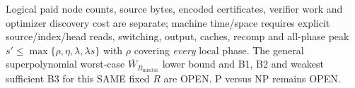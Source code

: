 \documentclass[11pt]{article}
\begin{document}
Logical paid node counts, source bytes, encoded certificates, verifier work and optimizer discovery cost are separate; machine time/space requires explicit source/index/head reads, switching, output, caches, recomp and all-phase peak $s'\le\max\{\rho,\eta,\lambda,\lambda s\}$ with $\rho$ covering \emph{every} local phase. The general superpolynomial worst-case $ \overline W_{R_{\mathrm{mix341}}}$ lower bound and B1, B2 and weakest sufficient B3 for this SAME fixed $R$ are OPEN. P versus NP remains OPEN.
\end{document}
